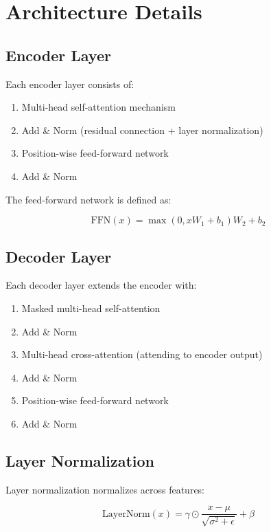 \documentclass[12pt,a4paper]{article}
\begin{document}
\section{Architecture Details}

\subsection{Encoder Layer}

Each encoder layer consists of:

\begin{enumerate}
    \item Multi-head self-attention mechanism
    \item Add \& Norm (residual connection + layer normalization)
    \item Position-wise feed-forward network
    \item Add \& Norm
\end{enumerate}

The feed-forward network is defined as:

\begin{equation}
\text{FFN}(x) = \max(0, xW_1 + b_1)W_2 + b_2
\end{equation}

\subsection{Decoder Layer}

Each decoder layer extends the encoder with:

\begin{enumerate}
    \item Masked multi-head self-attention
    \item Add \& Norm
    \item Multi-head cross-attention (attending to encoder output)
    \item Add \& Norm
    \item Position-wise feed-forward network
    \item Add \& Norm
\end{enumerate}

\subsection{Layer Normalization}

Layer normalization normalizes across features:

\begin{equation}
\text{LayerNorm}(x) = \gamma \odot \frac{x - \mu}{\sqrt{\sigma^2 + \epsilon}} + \beta
\end{equation}
\end{document}
